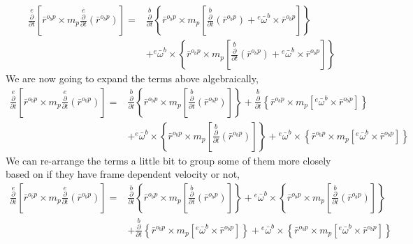 \begin{align*}
\overset{e}{\frac{\partial}{\partial t}}\left[\bar{r}^{o_{b}p}\times m_{p}\overset{e}{\frac{\partial}{\partial t}}(\bar{r}^{o_{b}p})\right] = &
\overset{b}{\frac{\partial}{\partial t}}\left\{\bar{r}^{o_{b}p}\times m_{p}\left[\overset{b}{\frac{\partial}{\partial t}}(\bar{r}^{o_{b}p}) + {}^{e}\bar{\omega}^{b}\times\bar{r}^{o_{b}p}\right]\right\} 
\\ & + {}^{e}\bar{\omega}^{b}\times\left\{\bar{r}^{o_{b}p}\times m_{p}\left[\overset{b}{\frac{\partial}{\partial t}}(\bar{r}^{o_{b}p}) + {}^{e}\bar{\omega}^{b}\times\bar{r}^{o_{b}p}\right]\right\}
\end{align*}
We are now going to expand the terms above algebraically,
\begin{align*}
\overset{e}{\frac{\partial}{\partial t}}\left[\bar{r}^{o_{b}p}\times m_{p}\overset{e}{\frac{\partial}{\partial t}}(\bar{r}^{o_{b}p})\right] = &
\overset{b}{\frac{\partial}{\partial t}}\left\{\bar{r}^{o_{b}p}\times m_{p}\left[\overset{b}{\frac{\partial}{\partial t}}(\bar{r}^{o_{b}p})\right]\right\} 
 + \overset{b}{\frac{\partial}{\partial t}}\left\{\bar{r}^{o_{b}p}\times m_{p}\left[{}^{e}\bar{\omega}^{b}\times\bar{r}^{o_{b}p}\right]\right\} 
\\ & 
 + {}^{e}\bar{\omega}^{b}\times\left\{\bar{r}^{o_{b}p}\times m_{p}\left[\overset{b}{\frac{\partial}{\partial t}}(\bar{r}^{o_{b}p})\right]\right\}
 + {}^{e}\bar{\omega}^{b}\times\left\{\bar{r}^{o_{b}p}\times m_{p}\left[{}^{e}\bar{\omega}^{b}\times\bar{r}^{o_{b}p}\right]\right\}
\end{align*}
We can re-arrange the terms a little bit to group some of them more closely based on if they have frame dependent velocity or not,
\begin{align*}
\overset{e}{\frac{\partial}{\partial t}}\left[\bar{r}^{o_{b}p}\times m_{p}\overset{e}{\frac{\partial}{\partial t}}(\bar{r}^{o_{b}p})\right] = &
\overset{b}{\frac{\partial}{\partial t}}\left\{\bar{r}^{o_{b}p}\times m_{p}\left[\overset{b}{\frac{\partial}{\partial t}}(\bar{r}^{o_{b}p})\right]\right\} 
 + {}^{e}\bar{\omega}^{b}\times\left\{\bar{r}^{o_{b}p}\times m_{p}\left[\overset{b}{\frac{\partial}{\partial t}}(\bar{r}^{o_{b}p})\right]\right\}
\\ & 
 + \overset{b}{\frac{\partial}{\partial t}}\left\{\bar{r}^{o_{b}p}\times m_{p}\left[{}^{e}\bar{\omega}^{b}\times\bar{r}^{o_{b}p}\right]\right\} 
 + {}^{e}\bar{\omega}^{b}\times\left\{\bar{r}^{o_{b}p}\times m_{p}\left[{}^{e}\bar{\omega}^{b}\times\bar{r}^{o_{b}p}\right]\right\}
\end{align*}
